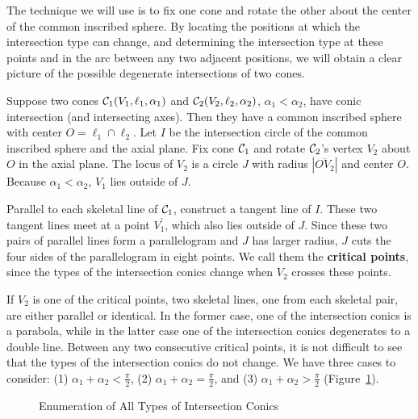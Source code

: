 The technique we will use is to fix one cone and rotate the other about the
center of the common inscribed sphere.  By locating the positions
at which the
intersection type can change, and determining the intersection type at these
points and in the arc between any two adjacent positions, we will obtain a
clear picture of the possible degenerate intersections of two cones.

     Suppose two cones ${\cal C}_1(V_1,\ell_1,\alpha_1)$ and
${\cal C}_2(V_2,\ell_2,\alpha_2)$, $\alpha_1<\alpha_2$, have
conic intersection (and intersecting axes).
Then they have a common
inscribed sphere with center $O=\ell_1\cap\ell_2$.  Let $I$ be the intersection
circle of the common inscribed sphere and the axial plane.
Fix cone ${\cal C}_1$ and rotate ${\cal C}_2$'s vertex
$V_2$ about $O$ in the axial plane.
The locus of $V_2$ is a circle $J$ with
radius $|\overline{OV_2}|$ and center $O$.  Because $\alpha_1<\alpha_2$, $V_1$
lies outside of $J$.

\begin{definition}
Parallel to each skeletal line of ${\cal C}_1$, construct
a tangent line of $I$.  These two tangent lines meet at a point $V_1^\prime$,
which also lies outside of $J$.  Since these two pairs of parallel lines form a
parallelogram and $J$ has larger radius, $J$ cuts the four sides of the
parallelogram in eight points.  We call them the
{\bf critical points},
since the types of the intersection conics change
when $V_2$ crosses these points.
\end{definition}

If $V_2$ is one of the critical points,
two skeletal lines, one from each skeletal pair, are either parallel or
identical.  In the former case, one of the intersection conics is a parabola,
while in the latter case one of the intersection conics degenerates to a double
line.  Between any two consecutive critical points, it is not difficult to see
that the types of the intersection conics do not change.
We have three cases to consider:
(1) $\alpha_1+\alpha_2<\frac{\pi}{2}$, (2) $\alpha_1+\alpha_2=\frac{\pi}{2}$,
and (3) $\alpha_1+\alpha_2>\frac{\pi}{2}$ (Figure~\ref{fig:enum}).
\begin{figure}
\vspace{4.5cm}
\caption{Enumeration of All Types of Intersection Conics}
\label{fig:enum}
\end{figure}

